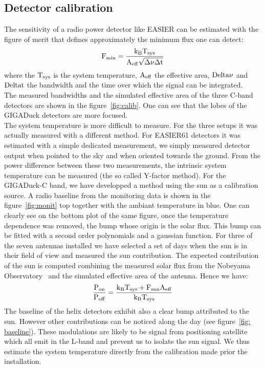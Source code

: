\documentclass{PoS}
\begin{document}
\subsection{Detector calibration}
The sensitivity of a radio power detector like EASIER can be estimated with the figure of merit that defines approximately the minimum flux one can detect:
\begin{equation}
	\rm	F_{min} = \frac{k_{B}T_{sys}}{A_{eff}\sqrt{\Delta \nu \Delta t}}
\end{equation}
where the $\rm T_{sys}$ is the system temperature, $\rm A_{eff}$ the effective area, $\rm Delta \nu$ and $\rm Delta t$ the bandwidth and the time over which the signal can be integrated.\\
The measured bandwidths and the simulated effective area of the three C-band detectors are shown in the figure~\ref{fig:calib}. One can see that the lobes of the GIGADuck detectors are more focused. \\ The system temperature is more difficult to measure. For the three setups it was actually measured with a different method. For EASIER61 detectors it was estimated with a simple dedicated measurement, we simply measured detector output when pointed to the sky and when oriented towards the ground. From the power difference between these two measurements, the intrinsic system temperature can be measured (the so called Y-factor method). For the GIGADuck-C band, we have developped a method using the sun as a calibration source. A radio baseline from the monitoring data is shown in the figure~\ref{fig:monit} top together with the ambiant temperature in blue. One can clearly see on the bottom plot  of the same figure, once the temperature dependence was removed, the bump whose origin is the solar flux. This bump can be fitted with a second order polynomials and a gaussian function. For three of the seven antennas installed we have selected a set of days when the sun is in their field of view and measured the sun contribution. The expected contribution of the sun  is computed combining the measured solar flux from the Nobeyama Observatory~\cite{bib:nobeyama} and the simulated effective area of the antenna. Hence we have:
\begin{equation}
	\rm	\frac{P_{on}}{P_{off}} = \frac{k_{B}T_{sys} + F_{sun}A_{eff}}{k_{B}T_{sys}}
\end{equation}
The baseline of the helix detectors exhibit also a clear bump attributed to the sun. However other contributions can be noticed along the day (see figure~\ref{fig: baseline}). These modulations are likely to be signal from positioning satellite which all emit in the L-band and prevent us to isolate the sun signal. We thus estimate the system temperature directly from the calibration made prior the installation.
\end{document}
